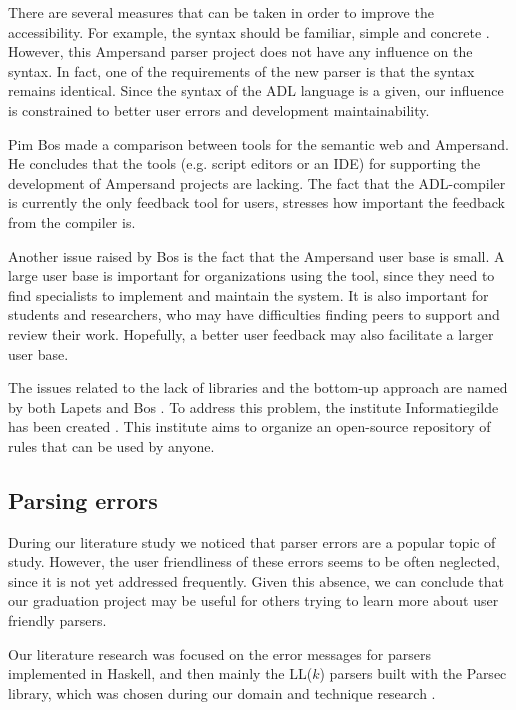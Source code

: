 There are several measures that can be taken in order to improve the accessibility.
For example, the syntax should be familiar, simple and concrete .
However, this Ampersand parser project does not have any influence on the syntax.
In fact, one of the requirements of the new parser is that the syntax remains identical.
Since the syntax of the ADL language is a given, our influence is constrained to better user errors and development maintainability.

%
Pim Bos  made a comparison between tools for the semantic web and Ampersand.
He concludes that the tools (e.g. script editors or an IDE) for supporting the development of Ampersand projects are lacking.
The fact that the ADL-compiler is currently the only feedback tool for users, stresses how important the feedback from the compiler is.

Another issue raised by Bos is the fact that the Ampersand user base is small.
A large user base is important for organizations using the tool, since they need to find specialists to implement and maintain the system.
It is also important for students and researchers, who may have difficulties finding peers to support and review their work.
Hopefully, a better user feedback may also facilitate a larger user base.

The issues related to the lack of libraries and the bottom-up approach are named by both Lapets  and Bos .
To address this problem, the institute Informatiegilde has been created .
This institute aims to organize an open-source repository of rules that can be used by anyone.

\subsection{Parsing errors}
During our literature study we noticed that parser errors are a popular topic of study.
However, the user friendliness of these errors seems to be often neglected, since it is not yet addressed frequently.
Given this absence, we can conclude that our graduation project may be useful for others trying to learn more about user friendly parsers.

Our literature research was focused on the error messages for parsers implemented in Haskell, and then mainly the LL($k$) parsers built with the Parsec library, which was chosen during our domain and technique research .

